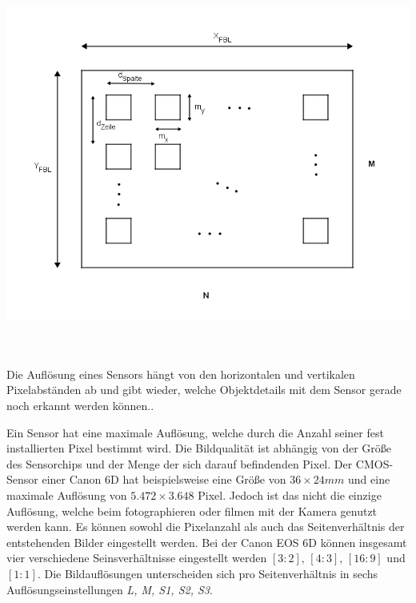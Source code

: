 \begin{minipage}{\linewidth}
	\centering
	\includegraphics[width=.8\linewidth]{images/Bildsensor_mit_Pixel.png}
	\label{fig:Sensor}
\end{minipage}\\ \\


Die Auflösung eines Sensors hängt von den horizontalen und vertikalen Pixelabständen ab und gibt wieder, welche Objektdetails mit dem Sensor gerade noch erkannt werden können.\cite{Photonik}. 


Ein Sensor hat eine maximale Auflösung, welche durch die Anzahl seiner fest installierten Pixel bestimmt wird. Die Bildqualität ist abhängig von der Größe des Sensorchips und der Menge der sich darauf befindenden Pixel. Der CMOS-Sensor einer Canon 6D hat beispielsweise eine Größe von $36 \times 24 mm$ und eine maximale Auflösung von $5.472 \times 3.648$ Pixel. Jedoch ist das nicht die einzige Auflösung, welche beim fotographieren oder filmen mit der Kamera genutzt werden kann. Es können sowohl die Pixelanzahl als auch das Seitenverhältnis der entstehenden Bilder eingestellt werden. Bei der Canon EOS 6D können insgesamt vier verschiedene Seinsverhältnisse eingestellt werden $[3:2], \,[4:3], \,[16:9]$ und $[1:1]$\cite{Canon6D}. Die Bildauflösungen unterscheiden sich pro Seitenverhältnis in sechs Auflösungseinstellungen \textit{L, M, S1, S2, S3}. 


